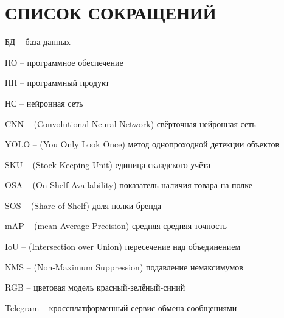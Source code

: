 \sectionbreak \section*{ 
    \gostTitleFont
    \redline
    СПИСОК СОКРАЩЕНИЙ
}
\titlespace

{\gostFont

\par \redline БД -- база данных
\par \redline ПО -- программное обеспечение
\par \redline ПП -- программный продукт
\par \redline НС -- нейронная сеть
\par \redline CNN -- (Convolutional Neural Network) свёрточная нейронная сеть
\par \redline YOLO -- (You Only Look Once) метод однопроходной детекции объектов
\par \redline SKU -- (Stock Keeping Unit) единица складского учёта
\par \redline OSA -- (On‑Shelf Availability) показатель наличия товара на полке
\par \redline SOS -- (Share of Shelf) доля полки бренда
\par \redline mAP -- (mean Average Precision) средняя средняя точность
\par \redline IoU -- (Intersection over Union) пересечение над объединением
\par \redline NMS -- (Non‑Maximum Suppression) подавление немаксимумов
\par \redline RGB -- цветовая модель красный‑зелёный‑синий
\par \redline Telegram -- кроссплатформенный сервис обмена сообщениями

}

\setcounter{subchaptercntr}{1}
\setcounter{formulacntr}{1}
\setcounter{imagecntr}{1}	